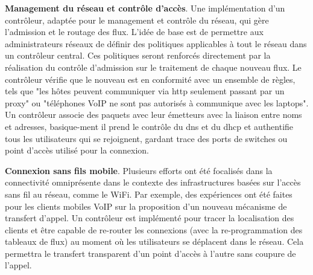 \textbf{Management du réseau et contrôle d'accès}.
Une implémentation d'un contrôleur, adaptée pour le management et contrôle du réseau, qui gère l'admission et le routage des flux. L'idée de base est de permettre aux administrateurs réseaux de définir des politiques applicables à tout le réseau dans un contrôleur central. Ces politiques seront renforcés directement par la réalisation du contrôle d'admission sur le traitement de chaque nouveau flux. Le contrôleur vérifie que le nouveau est en conformité avec un ensemble de règles, tels que "les hôtes peuvent communiquer via \gls{http} seulement passant par un proxy" ou "téléphones VoIP ne sont pas autorisés à communique avec les laptops". Un contrôleur associe des paquets avec leur émetteurs avec la liaison entre noms et adresses, basique-ment il prend le contrôle du \gls{dns} et du \gls{dhcp} et authentifie tous les utilisateurs qui se rejoignent, gardant trace des ports de switches ou point d'accès utilisé pour la connexion.


\textbf{Connexion sans fils mobile}.
Plusieurs efforts ont été focalisés dans la connectivité omniprésente dans le contexte des infrastructures basées sur l'accès sans fil au réseau, comme le WiFi. Par exemple, des expériences ont été faites pour les clients mobiles VoIP sur la proposition d'un nouveau mécanisme de transfert d'appel. Un contrôleur est implémenté pour tracer la localisation des clients et être capable de re-router les connexions (avec la re-programmation des tableaux de flux) au moment où les utilisateurs se déplacent dans le réseau. Cela permettra le transfert transparent d'un point d'accès à l'autre sans coupure de l'appel. \cite{OpenFlowStanfordUsing}

